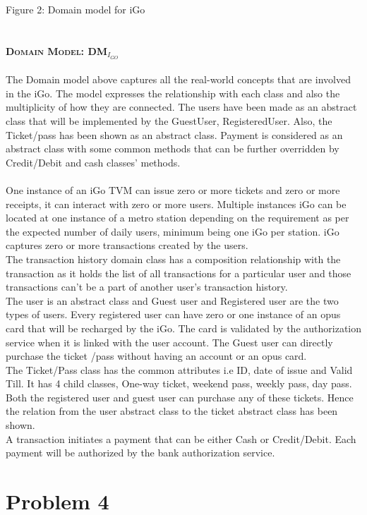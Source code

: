 \documentclass[a4paper, 11pt]{report}
\begin{document}
{\tab\tab\qquad\qquad\qquad\qquad\qquad Figure 2: Domain model for iGo\\
\\
\\
\textsc{\large{\bf{Domain Model: DM$_{I_{GO}}$ } }}\\\\ The Domain model above captures all the real-world concepts that are involved in the iGo. The model expresses the relationship with each class and also the multiplicity of how they are connected. The users have been made as an abstract class that will be implemented by the GuestUser, RegisteredUser.
Also, the Ticket/pass has been shown as an abstract class. Payment is considered as an abstract class with some common methods that can be further overridden by Credit/Debit and cash classes' methods.
\\\\
One instance of an iGo TVM can issue zero or more tickets and zero or more receipts, it can interact with zero or more users. Multiple instances iGo can be located at one instance of a metro station depending on the requirement as per the expected number of daily users, minimum being one iGo per station. iGo captures zero or more transactions created by the users.
\\
The transaction history domain class has a composition relationship with the transaction as it holds the list of all transactions for a particular user and those transactions can't be a part of another user's transaction history.
\\
The user is an abstract class and Guest user and Registered user are the two types of users. Every registered user can have zero or one instance of an opus card that will be recharged by the iGo. The card is validated by the authorization service when it is linked with the user account. The Guest user can directly purchase the ticket /pass without having an account or an opus card.
\\
The Ticket/Pass class has the common attributes i.e ID, date of issue and Valid Till. It has 4 child classes, One-way ticket, weekend pass, weekly pass, day pass. Both the registered user and guest user can purchase any of these tickets. Hence the relation from the user abstract class to the ticket abstract class has been shown. 
\\
A transaction initiates a payment that can be either Cash or Credit/Debit. Each payment will be authorized by the bank authorization service.
\chapter{Problem 4}
}
\end{document}
